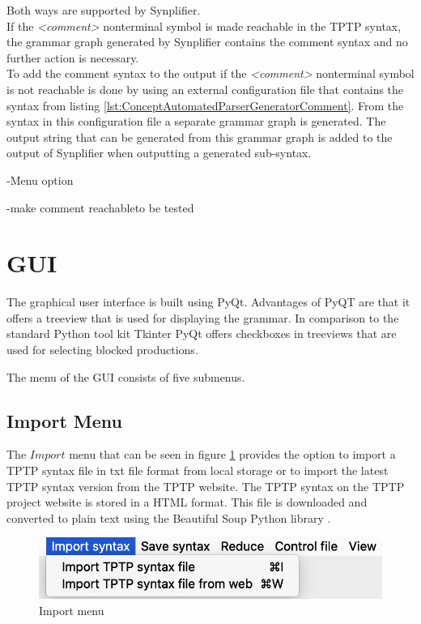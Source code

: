 Both ways are supported by \ac{Synplifier}.\\
If the \textit{<comment>} nonterminal symbol is made reachable in the \ac{TPTP} syntax, the grammar graph generated by \ac{Synplifier} contains the comment syntax and no further action is necessary.\\
To add the comment syntax to the output if the \textit{<comment>} nonterminal symbol is not reachable is done by using an external configuration file that contains the syntax from listing \ref{lst:ConceptAutomatedParserGeneratorComment}.
From the syntax in this configuration file a separate grammar graph is generated. The output string that can be generated from this grammar graph is added to the output of \ac{Synplifier} when outputting a generated sub-syntax.

-Menu option

-make comment reachableto be tested

\section{GUI}\label{sec:ConceptGUI}

The graphical user interface is built using PyQt. Advantages of PyQT are that it offers a treeview that is used for displaying the grammar. In comparison to the standard Python tool kit Tkinter PyQt offers checkboxes in treeviews \cite{Tkinter} that are used for selecting blocked productions.

The menu of the GUI consists of five submenus.

\subsection{Import Menu}\label{sec:ConceptGUIImportMenu}

The $Import$ menu that can be seen in figure \ref{fig:import} provides the option to import a \ac{TPTP} syntax file in txt file format from local storage or to import the latest \ac{TPTP} syntax version from the \ac{TPTP} website.
The \ac{TPTP} syntax on the \ac{TPTP} project website is stored in a HTML format.
This file is downloaded and converted to plain text using the Beautiful Soup Python library \cite{BeautifulSoup}.

\begin{figure}[H]
\centering
\includegraphics[width=.7\textwidth]{images/import.png}
\caption{Import menu}
\label{fig:import}
\end{figure}

